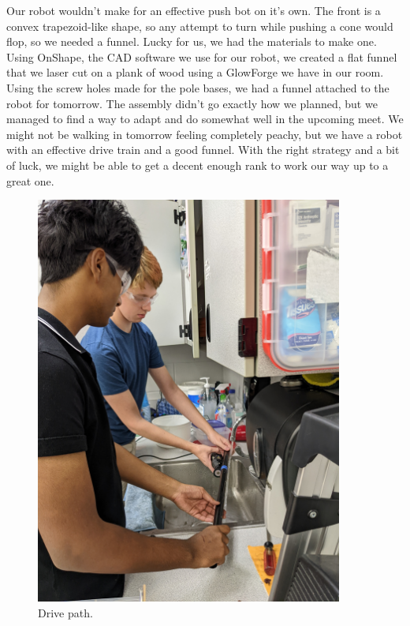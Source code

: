 Our robot wouldn't make for an effective push bot on it's own. The front is a convex trapezoid-like shape, so any attempt to turn while pushing a cone would flop, so we needed a funnel. Lucky for us, we had the materials to make one. Using OnShape, the CAD software we use for our robot, we created a flat funnel that we laser cut on a plank of wood using a GlowForge we have in our room. Using the screw holes made for the pole bases, we had a funnel attached to the robot for tomorrow.
The assembly didn't go exactly how we planned, but we managed to find a way to adapt and do somewhat well in the upcoming meet. We might not be walking in tomorrow feeling completely peachy, but we have a robot with an effective drive train and a good funnel. With the right strategy and a bit of luck, we might be able to get a decent enough rank to work our way up to a great one.

\begin{figure}[htp]
\centering
\includegraphics[width=0.9\textwidth, angle=0]{Meetings/November/11-04-22/11-04-22-Poles.jpg}
\caption{Drive path.}
\label{fig:102722_1}
\end{figure}

